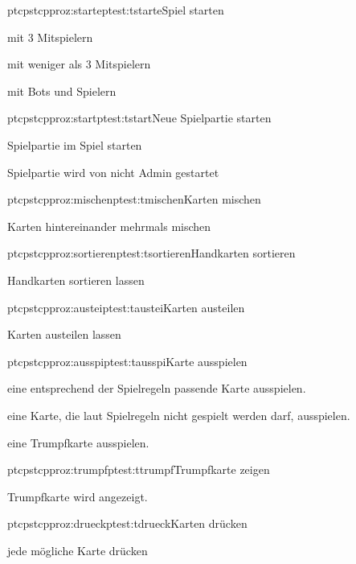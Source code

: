 \begin{description}[leftmargin=3em, style=sameline]
	\begin{pftp}{ptc}{pstc}{pproz:starte}{ptest:tstarte}{Spiel starten}
		\item	mit 3 Mitspielern
		\item	mit weniger als 3 Mitspielern
		\item	mit Bots und Spielern
	\end{pftp}
		
	\begin{pftp}{ptc}{pstc}{pproz:start}{ptest:tstart}{Neue Spielpartie starten}
		\item	Spielpartie im Spiel starten
		\item	Spielpartie wird von nicht Admin gestartet
	\end{pftp}
		
	\begin{pftp}{ptc}{pstc}{pproz:mischen}{ptest:tmischen}{Karten mischen}
		\item	Karten hintereinander mehrmals mischen
	\end{pftp}
		
	\begin{pftp}{ptc}{pstc}{pproz:sortieren}{ptest:tsortieren}{Handkarten sortieren}
		\item	Handkarten sortieren lassen
	\end{pftp}
		
	\begin{pftp}{ptc}{pstc}{pproz:austei}{ptest:taustei}{Karten austeilen}
		\item	Karten austeilen lassen
	\end{pftp}
		
	\begin{pftp}{ptc}{pstc}{pproz:ausspi}{ptest:tausspi}{Karte ausspielen}
		\item eine entsprechend der Spielregeln passende Karte ausspielen.
		\item eine Karte, die laut Spielregeln nicht gespielt werden darf, ausspielen.
		\item eine Trumpfkarte ausspielen.
	\end{pftp}
		
	
		
	\begin{pftp}{ptc}{pstc}{pproz:trumpf}{ptest:ttrumpf}{Trumpfkarte zeigen}
		\item	Trumpfkarte wird angezeigt.
	\end{pftp}
		
	\begin{pftp}{ptc}{pstc}{pproz:drueck}{ptest:tdrueck}{Karten drücken}
		\item	jede mögliche Karte drücken
	\end{pftp}	
		

\end{description}
